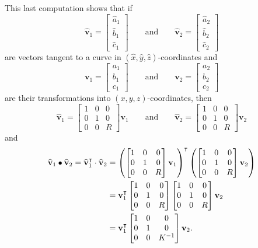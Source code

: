 \documentclass[newpage,hints,handout,12pt,noauthor,nooutcomes]{ximera}
\begin{document}
This last computation shows that if
\[
\hat{\mathbf v}_{1}=\begin{bmatrix}\hat{a}_{1} \\ \hat{b}_{1} \\ \hat{c}_{1}\end{bmatrix}
\qquad\text{and}\qquad
\hat{\mathbf v}_{2} =\begin{bmatrix}\hat{a}_{2} \\ \hat{b}_{2} \\ \hat{c}_{2}\end{bmatrix}
\]
are vectors tangent to a curve in $(\hat{x},\hat{y},\hat{z})$-coordinates and
\[
\mathbf{v}_{1}=\begin{bmatrix}a_{1} \\ b_{1} \\ c_{1}\end{bmatrix}
\qquad\text{and}\qquad
\mathbf{v}_{2} =\begin{bmatrix}a_{2} \\ b_{2} \\ c_{2}\end{bmatrix}
\]
are their transformations into $(x,y,z)$-coordinates, then
\[
\hat{\mathbf v}_{1}=
\begin{bmatrix}
1 & 0 & 0\\
0 & 1 & 0\\
0 & 0 & R
\end{bmatrix}\mathbf{v}_{1}
\qquad\text{and}\qquad
\hat{\mathbf v}_{2}=
\begin{bmatrix}
1 & 0 & 0\\
0 & 1 & 0\\
0 & 0 & R
\end{bmatrix}\mathbf{v}_{2} 
\]
and%
\begin{align*}
\hat{\mathbf v}_{1}\bullet\hat{\mathbf v}_{2}
=\hat{\mathbf v}_{1}^\transpose \cdot \hat{\mathbf v}_{2} 
&= 
\left(\begin{bmatrix}
1 & 0 & 0\\
0 & 1 & 0\\
0 & 0 & R
\end{bmatrix}\mathbf{v}_{1}\right)^\transpose
\left(
\begin{bmatrix}
1 & 0 & 0\\
0 & 1 & 0\\
0 & 0 & R
\end{bmatrix}\mathbf{v}_{2}\right)\\
&=\mathbf{v}_{1}^\transpose
\begin{bmatrix}
1 & 0 & 0\\
0 & 1 & 0\\
0 & 0 & R
\end{bmatrix}
\begin{bmatrix}
1 & 0 & 0\\
0 & 1 & 0\\
0 & 0 & R
\end{bmatrix}
\mathbf{v}_{2}\\
&=\mathbf{v}_{1}^\transpose
\begin{bmatrix}
1 & 0 & 0\\
0 & 1 & 0\\
0 & 0 & K^{-1}%
\end{bmatrix}
\mathbf{v}_{2}.
\end{align*}
\end{document}
